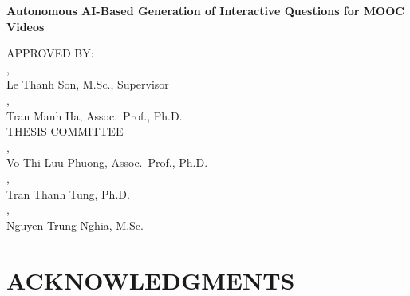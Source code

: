 \documentclass[a4paper,12pt]{report}
\begin{document}
\clearpage
\thispagestyle{empty} 
\begin{center}
  {\Large\bfseries Autonomous AI-Based Generation of Interactive Questions for MOOC Videos}

  \vspace{2cm}

  \large
  APPROVED BY:\\[1cm]
  \underline{\hspace{8cm}} , \\
  Le Thanh Son, M.Sc., Supervisor\\[1cm]
  \underline{\hspace{8cm}} ,\\
  Tran Manh Ha, Assoc.\ Prof., Ph.D.\\[3cm]

  THESIS COMMITTEE\\[1cm]
  \underline{\hspace{8cm}} ,\\
  Vo Thi Luu Phuong, Assoc.\ Prof., Ph.D.\\[1cm]
  \underline{\hspace{8cm}} ,\\
  Tran Thanh Tung, Ph.D.\\[1cm]
  \underline{\hspace{8cm}} ,\\
  Nguyen Trung Nghia, M.Sc.
\end{center}

\clearpage
\chapter*{ACKNOWLEDGMENTS}
\thispagestyle{empty} 


\clearpage
\setcounter{tocdepth}{2}
\tableofcontents

\clearpage
\listoffigures
{}

\clearpage
\listoftables
{}

\clearpage
\clearpage
\end{document}
